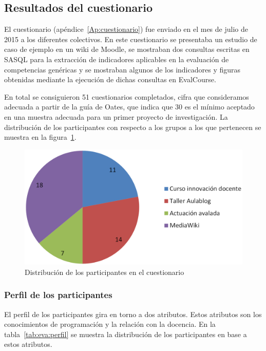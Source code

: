 \subsection{Resultados del cuestionario}

El cuestionario (apéndice~\ref{Ap:cuestionario}) fue enviado en el mes de julio de 2015 a los diferentes colectivos. En este cuestionario se presentaba un estudio de caso de ejemplo en un wiki de Moodle, se mostraban dos consultas escritas en SASQL para la extracción de indicadores aplicables en la evaluación de competencias genéricas y se mostraban algunos de los indicadores y figuras obtenidas mediante la ejecución de dichas consultas en EvalCourse. 

En total se consiguieron 51 cuestionarios completados, cifra que consideramos adecuada a partir de la guía de Oates, que indica que 30 es el mínimo aceptado en una muestra adecuada para un primer proyecto de investigación. La distribución de los participantes con respecto a los grupos a los que pertenecen se muestra en la figura~\ref{fig:ResultadosParticipantes}.

\begin{figure}
  \begin{center}
    \includegraphics[scale=0.3]{ResultadosParticipantes.png}
  \end{center}
  \caption{Distribución de los participantes en el cuestionario}
  \label{fig:ResultadosParticipantes}
\end{figure}

\subsubsection{Perfil de los participantes}

El perfil de los participantes gira en torno a dos atributos. Estos atributos son los conocimientos de programación y la relación con la docencia. En la tabla~\ref{tab:eva:perfil} se muestra la distribución de los participantes en base a estos atributos.

